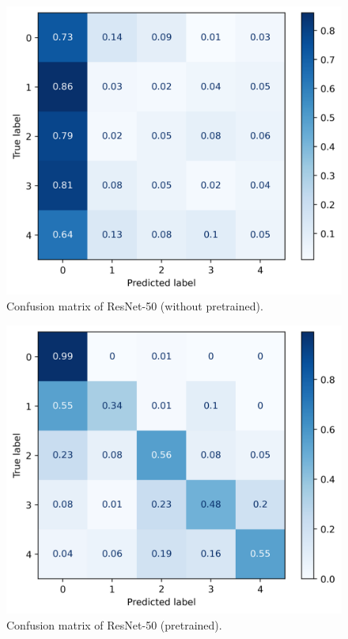 	\begin{figure}[H]
		\centering
		\includegraphics[scale=0.8]{img/resnet50_confusion_matrix_mine.png}
		\caption{Confusion matrix of ResNet-50 (without pretrained).}
		\label{resnet50-mine-confusion-matrix}
	\end{figure}
	\begin{figure}[H]
		\centering
		\includegraphics[scale=0.8]{img/resnet50_confusion_matrix_pretrained.png}
		\caption{Confusion matrix of ResNet-50 (pretrained).}
		\label{resnet50-pretrained-confusion-matrix}
	\end{figure}
